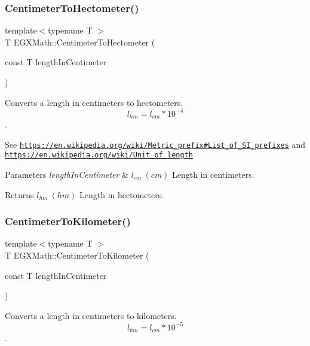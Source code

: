 \subsubsection{\texorpdfstring{Centimeter\+To\+Hectometer()}{CentimeterToHectometer()}}
{\footnotesize\ttfamily template$<$typename T $>$ \\
T E\+G\+X\+Math\+::\+Centimeter\+To\+Hectometer (\begin{DoxyParamCaption}\item[{const T}]{length\+In\+Centimeter }\end{DoxyParamCaption})}



Converts a length in centimeters to hectometers. \[ l_{hm}=l_{cm} * 10^{-4} \]. 

See \href{https://en.wikipedia.org/wiki/Metric_prefix#List_of_SI_prefixes}{\tt https\+://en.\+wikipedia.\+org/wiki/\+Metric\+\_\+prefix\#\+List\+\_\+of\+\_\+\+S\+I\+\_\+prefixes} and \href{https://en.wikipedia.org/wiki/Unit_of_length}{\tt https\+://en.\+wikipedia.\+org/wiki/\+Unit\+\_\+of\+\_\+length} 
\begin{DoxyParams}{Parameters}
{\em length\+In\+Centimeter} & $ l_{cm}\ (cm)$ Length in centimeters. \\
\hline
\end{DoxyParams}
\begin{DoxyReturn}{Returns}
$ l_{hm}\ (hm)$ Length in hectometers. 
\end{DoxyReturn}
\mbox{\label{group___e_g_x_math-_conversions-_length_conversions-_centimeter-_s_i_ga3735c75e13286501568075ee1dfb97b7}} 
\subsubsection{\texorpdfstring{Centimeter\+To\+Kilometer()}{CentimeterToKilometer()}}
{\footnotesize\ttfamily template$<$typename T $>$ \\
T E\+G\+X\+Math\+::\+Centimeter\+To\+Kilometer (\begin{DoxyParamCaption}\item[{const T}]{length\+In\+Centimeter }\end{DoxyParamCaption})}



Converts a length in centimeters to kilometers. \[ l_{km}=l_{cm} * 10^{-5} \]. 

